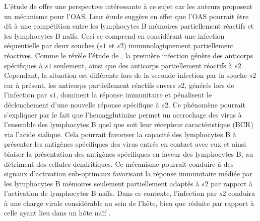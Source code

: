 L'étude de \citet{Kim2009} offre une perspective intéressante à ce
sujet car les auteurs proposent un mécanisme pour l'OAS. Leur étude
suggère en effet que l'OAS pourrait être dû à une compétition entre
les lymphocytes B mémoires partiellement réactifs et les lymphocytes B
naïfs. Ceci se comprend en considérant une infection séquentielle par
deux souches ($s1$ et $s2$) immunologiquement partiellement réactives.
Comme le révèle l'étude de \citet{Kim2009}, la première infection
génère des anticorps spécifiques à $s1$ seulement, ainsi que des
anticorps partiellement réactifs à $s2$. Cependant, la situation est
différente lors de la seconde infection par la souche $s2$ car à
présent, les anticorps partiellement réactifs envers $s2$, générés
lors de l'infection par $s1$, dominent la réponse immunitaire et
pénalisent le déclenchement d'une nouvelle réponse spécifique à $s2$.
Ce phénomène pourrait s'expliquer par le fait que l'hemagglutinine
permet un accrochage des virus à l'ensemble des lymphocytes B quel que
soit leur récepteur caractéristique (BCR) via l'acide sialique. Cela
pourrait favoriser la capacité des lymphocytes B à présenter les
antigènes spécifiques des virus entrés en contact avec eux et ainsi
biaiser la présentation des antigènes spécifiques en faveur des
lymphocytes B, au détriment des cellules dendritiques. Ce mécanisme
pourrait conduire à des signaux d'activation sub-optimaux favorisant
la réponse immunitaire médiée par les lymphocytes B mémoires seulement
partiellement adaptés à $s2$ par rapport à l'activation de lymphocytes
B naïfs. Dans ce contexte, l'infection par $s2$ conduira à une charge
virale considérable au sein de l'hôte, bien que réduite par rapport à
celle ayant lieu dans un hôte naïf \citep{Kim2009}.

